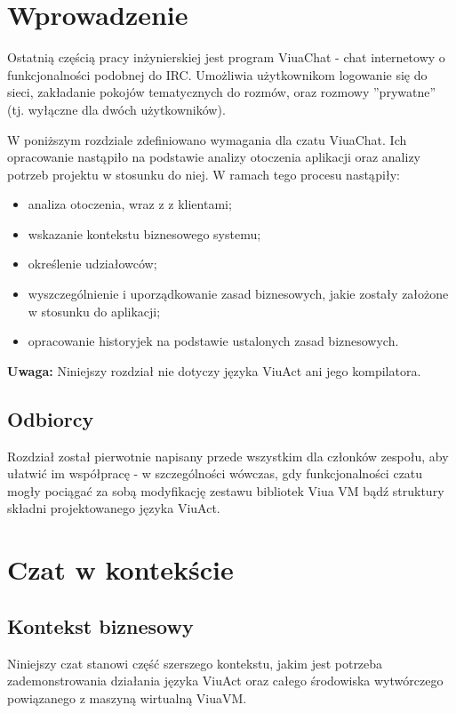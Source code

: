 \section{Wprowadzenie}

Ostatnią częścią pracy inżynierskiej jest program ViuaChat - chat internetowy o funkcjonalności podobnej do IRC.
Umożliwia użytkownikom logowanie się do sieci, zakładanie pokojów tematycznych do rozmów, oraz rozmowy
''prywatne'' (tj. wyłączne dla dwóch użytkowników).

W poniższym rozdziale zdefiniowano wymagania dla czatu ViuaChat. Ich opracowanie nastąpiło na podstawie analizy otoczenia aplikacji oraz analizy potrzeb projektu w stosunku do niej. W ramach tego procesu nastąpiły:
\begin{itemize}
    \item analiza otoczenia, wraz z z klientami;
    \item wskazanie kontekstu biznesowego systemu;
    \item określenie udziałowców;
	\item wyszczególnienie i uporządkowanie zasad biznesowych, jakie zostały założone w stosunku do aplikacji;
	\item opracowanie historyjek na podstawie ustalonych zasad biznesowych.
\end{itemize}

\textbf{Uwaga:} Niniejszy rozdział nie dotyczy języka ViuAct ani jego kompilatora.

\subsection{Odbiorcy}
Rozdział został pierwotnie napisany przede wszystkim dla członków zespołu, aby ułatwić im współpracę - w szczególności wówczas, gdy funkcjonalności czatu mogły pociągać za sobą modyfikację zestawu bibliotek Viua VM bądź struktury składni projektowanego języka ViuAct.

\section{Czat w kontekście}

\subsection{Kontekst biznesowy}

Niniejszy czat stanowi część szerszego kontekstu, jakim jest potrzeba zademonstrowania działania języka ViuAct oraz całego środowiska wytwórczego powiązanego z maszyną wirtualną ViuaVM.

